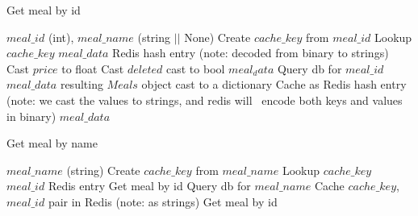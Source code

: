 \begin{algorithm}
\caption{Get meal by id}
    \begin{algorithmic}
        \REQUIRE $meal\_id$ (int), $meal\_name$ (string $||$ None)
        \STATE Create $cache\_key$ from $meal\_id$
        \STATE Lookup $cache\_key$
            \STATE $meal\_data$ \gets Redis hash entry
            \STATE \hspace{2em} (note: decoded from binary to strings)
            \STATE Cast $price$ to float
            \STATE Cast $deleted$ cast to bool
            \RETURN $meal_data$
        \ENDIF
        \STATE Query db for $meal\_id$
        \STATE $meal\_data$ \gets resulting $Meals$ object cast to a dictionary
        \STATE Cache as Redis hash entry
        \STATE \hspace{2em} (note: we cast the values to strings, and redis will
        \STATE \hspace{2em} ~encode both keys and values in binary)
        \RETURN $meal\_data$
    \end{algorithmic}
\end{algorithm}

\begin{algorithm}
    \caption{Get meal by name}
        \begin{algorithmic}
            \REQUIRE $meal\_name$ (string)
            \STATE Create $cache\_key$ from $meal\_name$
            \STATE Lookup $cache\_key$
                \STATE $meal\_id$ \gets Redis entry
                \RETURN Get meal by id
            \ENDIF
            \STATE Query db for $meal\_name$
            \STATE Cache $cache\_key$, $meal\_id$ pair in Redis (note: as strings)
            \RETURN Get meal by id
        \end{algorithmic}
    \end{algorithm}